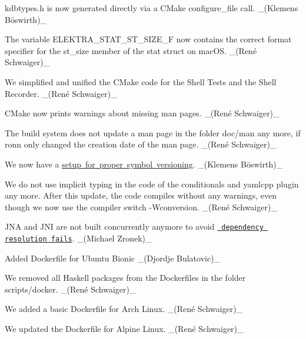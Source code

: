 \begin{DoxyItemize}
\item {\ttfamily kdbtypes.\+h} is now generated directly via a C\+Make {\ttfamily configure\+\_\+file} call. \+\_\+(Klemens Böswirth)\+\_\+
\item The variable {\ttfamily E\+L\+E\+K\+T\+R\+A\+\_\+\+S\+T\+A\+T\+\_\+\+S\+T\+\_\+\+S\+I\+Z\+E\+\_\+F} now contains the correct format specifier for the {\ttfamily st\+\_\+size} member of the {\ttfamily stat} struct on mac\+OS. \+\_\+(René Schwaiger)\+\_\+
\item We simplified and unified the C\+Make code for the Shell Tests and the Shell Recorder. \+\_\+(René Schwaiger)\+\_\+
\item C\+Make now prints warnings about missing man pages. \+\_\+(René Schwaiger)\+\_\+
\item The build system does not update a man page in the folder doc/man any more, if ronn only changed the creation date of the man page. \+\_\+(René Schwaiger)\+\_\+
\end{DoxyItemize}


\begin{DoxyItemize}
\item We now have a \mbox{\hyperlink{doc_dev_symbol-versioning_md}{setup for proper symbol versioning}}. \+\_\+(Klemens Böswirth)\+\_\+
\item We do not use implicit typing in the code of the {\ttfamily conditionals} and {\ttfamily yamlcpp} plugin any more. After this update, the code compiles without any warnings, even though we now use the compiler switch {\ttfamily -\/Wconversion}. \+\_\+(René Schwaiger)\+\_\+
\item J\+NA and J\+NI are not built concurrently anymore to avoid \href{https://jira.apache.org/jira/browse/MDEP-518}{\texttt{ dependency resolution fails}}. \+\_\+(\+Michael Zronek)\+\_\+
\end{DoxyItemize}


\begin{DoxyItemize}
\item Added Dockerfile for Ubuntu Bionic \+\_\+(\+Djordje Bulatovic)\+\_\+
\item We removed all Haskell packages from the Dockerfiles in the folder scripts/docker. \+\_\+(René Schwaiger)\+\_\+
\item We added a basic Dockerfile for Arch Linux. \+\_\+(René Schwaiger)\+\_\+
\item We updated the Dockerfile for Alpine Linux. \+\_\+(René Schwaiger)\+\_\+
\end{DoxyItemize}


